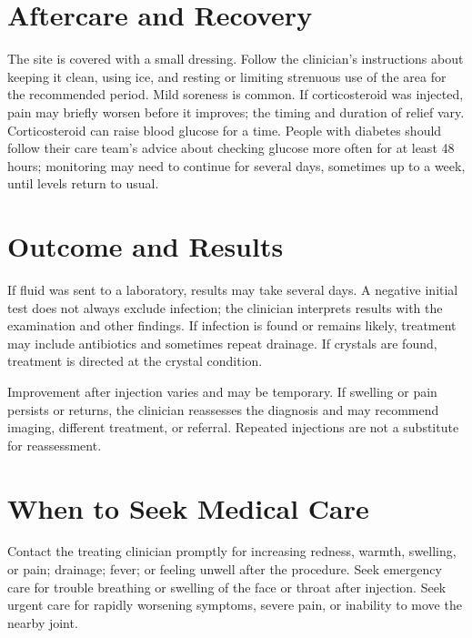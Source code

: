 \section*{Aftercare and Recovery}
The site is covered with a small dressing. Follow the clinician's instructions about keeping it clean, using ice, and resting or limiting strenuous use of the area for the recommended period. Mild soreness is common. If corticosteroid was injected, pain may briefly worsen before it improves; the timing and duration of relief vary. Corticosteroid can raise blood glucose for a time. People with diabetes should follow their care team's advice about checking glucose more often for at least 48 hours; monitoring may need to continue for several days, sometimes up to a week, until levels return to usual.

\section*{Outcome and Results}
If fluid was sent to a laboratory, results may take several days. A negative initial test does not always exclude infection; the clinician interprets results with the examination and other findings. If infection is found or remains likely, treatment may include antibiotics and sometimes repeat drainage. If crystals are found, treatment is directed at the crystal condition.

Improvement after injection varies and may be temporary. If swelling or pain persists or returns, the clinician reassesses the diagnosis and may recommend imaging, different treatment, or referral. Repeated injections are not a substitute for reassessment.

\section*{When to Seek Medical Care}
Contact the treating clinician promptly for increasing redness, warmth, swelling, or pain; drainage; fever; or feeling unwell after the procedure. Seek emergency care for trouble breathing or swelling of the face or throat after injection. Seek urgent care for rapidly worsening symptoms, severe pain, or inability to move the nearby joint.

